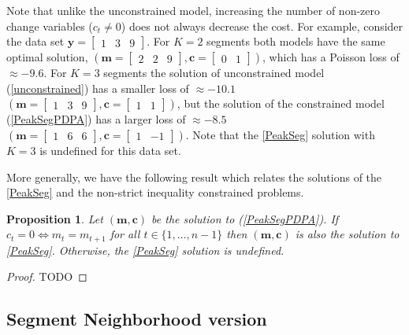 \documentclass{article}
\newtheorem{proposition}{Proposition}
\begin{document}
Note that unlike the unconstrained model, increasing the number of
non-zero change variables ($c_t\neq 0$) does not always decrease the
cost. For example, consider the data set
$\mathbf y = \left[\begin{array}{ccc}1 & 3 & 9 \end{array}\right]$.
For $K=2$ segments both models have the same optimal solution,
$(\mathbf m = \left[\begin{array}{ccc}2 & 2 & 9 \end{array}\right],
  \mathbf c = \left[\begin{array}{cc}  0 & 1 \end{array}\right])$,
which has a Poisson loss of $\approx -9.6$. 
For $K=3$ segments the solution of unconstrained model
(\ref{unconstrained}) has a smaller loss of $\approx -10.1$
$(\mathbf m = \left[\begin{array}{ccc}1 & 3 & 9 \end{array}\right],
  \mathbf c = \left[\begin{array}{cc}  1 & 1 \end{array}\right])$,
but the solution of the constrained model (\ref{PeakSegPDPA})
has a larger loss of $\approx -8.5$
$(\mathbf m = \left[\begin{array}{ccc}1 & 6 & 6 \end{array}\right],
  \mathbf c = \left[\begin{array}{cc}  1 & -1  \end{array}\right])$. 
Note that the \ref{PeakSeg} solution with $K=3$ is undefined for this data set.

More generally, we have the following result which relates the
solutions of the \ref{PeakSeg} and the non-strict inequality
constrained problems.

\begin{proposition}
  Let $(\mathbf m, \mathbf c)$ be the solution to
  (\ref{PeakSegPDPA}). If $c_t=0 \Leftrightarrow m_t = m_{t+1}$ for
  all $t\in\{1, \dots, n-1\}$ then $(\mathbf m, \mathbf c)$ is also
  the solution to \ref{PeakSeg}. Otherwise, the \ref{PeakSeg} solution
  is undefined.
\end{proposition}

\begin{proof}
  TODO
\end{proof}

\subsection{Segment Neighborhood version}
\end{document}
